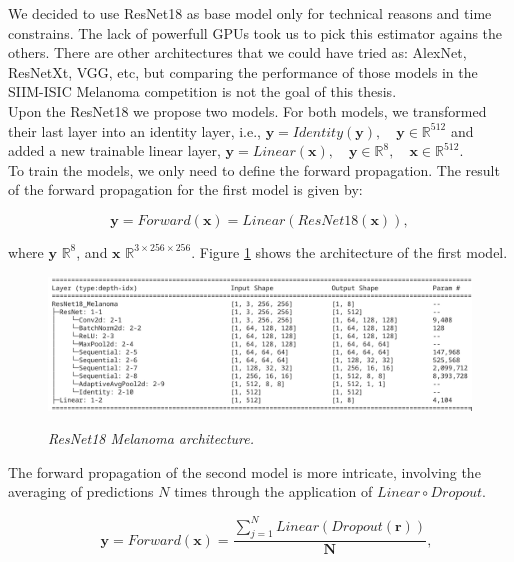 We decided to use ResNet18 as base model only for technical reasons and time
constrains. The lack of powerfull GPUs took us to pick this estimator agains
the others. There are other architectures that we could have tried as: AlexNet,
ResNetXt, VGG, etc, but comparing the performance of those models in the
SIIM-ISIC Melanoma competition is not the goal of this thesis. \\

Upon the ResNet18 we propose two models. For both models, we transformed their
last layer into an identity layer, i.e., \(\mathbf{y} = Identity(\mathbf{y}),
\quad \mathbf{y} \in \mathbb{R}^{512}\) and added a new trainable linear layer,
\(\mathbf{y} = Linear(\mathbf{x}), \quad \mathbf{y} \in \mathbb{R}^8, \quad
\mathbf{x} \in \mathbb{R}^{512}\). \\

To train the models, we only need to define the forward propagation. The result
of the forward propagation for the first model is given by:

\[ \mathbf{y} = Forward(\mathbf{x}) = Linear(ResNet18(\mathbf{x})), \]

where \( \mathbf{y} \) \in \( \mathbb{R}^8 \), and \( \mathbf{x} \) \in \(
\mathbb{R}^{3 \times 256 \times 256} \). Figure \ref{fig:resnet-18-melanoma-arch} shows
the architecture of the first model.

\begin{figure}[H]
  \centering
  \includegraphics[width=\textwidth]{imatges/methodological_contribution/ResNet18_Melanoma.png}
  \caption[ResNet18\_Melanoma architecture]{\textit{ResNet18 Melanoma architecture.}}
  {\label{fig:resnet-18-melanoma-arch}}
\end{figure}

The forward propagation of the second model is more intricate, involving the
averaging of predictions \(N\) times through the application of \(Linear \circ
Dropout\).

\[ \quad \mathbf{y} = Forward(\mathbf{x}) = \frac{\sum_{j=1}^{N} Linear(Dropout(\mathbf{r}))}{\mathbf{N}}, \]


